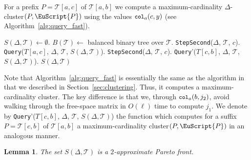 \documentclass[11pt]{article}
\newcommand{\fancy}[1]{\EuScript{#1}}
\newcommand{\maxcol}{\texttt{\small col}}
\newcommand{\pathlet}{cluster\xspace}
\newtheorem{lemma}{Lemma}
\begin{document}
For a prefix $P = \mathcal{T}[a, c]$ of $\mathcal{T}[a, b]$ we compute a maximum-cardinality $\Delta$-\pathlet $(P, {\fancy{P}})$ using the values $\maxcol_a(c, y)$ (see Algorithm~\ref{alg:query_fast}). 
%
%
%
%
 \begin{algorithm}[b]
    \caption{\textbf{PSC}($\Delta$, $\mathcal{T}$)}
    \label{alg:PSC}
    \begin{algorithmic}
    \State $S(\Delta, \mathcal{T}) \gets \emptyset$.
    \State $B(\mathcal{T}) \gets$ balanced binary tree over $\mathcal{T}$.
    \State \texttt{StepSecond}($\Delta$, $\mathcal{T}$, $c$).
    \State \texttt{Query}($T[a, c]$, $\Delta$, $\mathcal{T}$, $S(\Delta, \mathcal{T})$).
    \EndFor
    \State \texttt{StepSecond}($\Delta$, $\mathcal{T}$, $c$).
    \State \texttt{Query}'($T[c, b]$, $\Delta$, $\mathcal{T}$, $S(\Delta, \mathcal{T})$).
    \EndFor
    \EndFor
    \State \Return $S(\Delta, \mathcal{T})$
    \end{algorithmic}
  \end{algorithm}
%
%
%
%
Note that Algorithm~\ref{alg:query_fast} is essentially the same as the algorithm in~\cite{buchin2011detecting} that we described in Section~\ref{sec:clustering}. 
Thus, it computes a maximum-cardinality \pathlet.
The key difference is that we, through $\maxcol_a(b,j_2)$,  avoid walking through the free-space matrix in $O(\ell)$ time to compute $j_1$.  
We denote by  \texttt{Query}'($T[c, b]$, $\Delta$, $\mathcal{T}$, $S(\Delta, \mathcal{T})$) the function which computes for a suffix $P = \mathcal{T}[c, b]$ of $\mathcal{T}[a, b]$ a maximum-cardinality \pathlet  $(P, {\fancy{P}})$ in an analogous manner. 
%
\begin{lemma}
    The set $S(\Delta, \mathcal{T})$ is a $2$-approximate Pareto front. 
\end{lemma}
%
\end{document}
